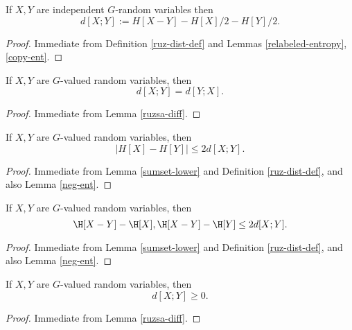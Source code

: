 \begin{lemma}\label{ruz-indep} If $X,Y$ are independent $G$-random variables then
  $$ d[X;Y] := H[X - Y] - H[X]/2 - H[Y]/2.$$
\end{lemma}

\begin{proof} Immediate from Definition \ref{ruz-dist-def} and Lemmas \ref{relabeled-entropy}, \ref{copy-ent}.
\end{proof}

\begin{lemma}\label{ruzsa-symm} If $X,Y$ are $G$-valued random variables, then
  $$ d[X;Y] = d[Y;X].$$
\end{lemma}

\begin{proof} Immediate from Lemma \ref{ruzsa-diff}.
\end{proof}

\begin{lemma}\label{ruzsa-diff} If $X,Y$ are $G$-valued random variables, then
$$|H[X]-H[Y]| \leq 2 d[X;Y].$$
\end{lemma}

\begin{proof} Immediate from Lemma \ref{sumset-lower} and Definition \ref{ruz-dist-def}, and also Lemma \ref{neg-ent}.
\end{proof}

\begin{lemma}\label{ruzsa-growth} If $X,Y$ are $G$-valued random variables, then
$$  \H[X-Y] - \H[X], \H[X-Y] - \H[Y] \leq 2d[X;Y].$$
\end{lemma}

\begin{proof} Immediate from Lemma \ref{sumset-lower} and Definition \ref{ruz-dist-def}, and also Lemma \ref{neg-ent}.
\end{proof}

\begin{lemma}\label{ruzsa-nonneg} If $X,Y$ are $G$-valued random variables, then
  $$ d[X;Y] \geq 0.$$
\end{lemma}

\begin{proof} Immediate from Lemma \ref{ruzsa-diff}.
\end{proof}

